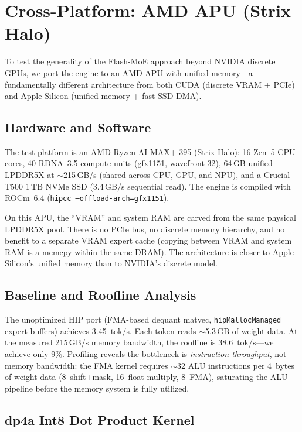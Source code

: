 \documentclass[10pt]{article}
\begin{document}
\section{Cross-Platform: AMD APU (Strix Halo)}
\label{sec:apu}

To test the generality of the Flash-MoE approach beyond NVIDIA discrete GPUs, we port the engine to an AMD APU with unified memory---a fundamentally different architecture from both CUDA (discrete VRAM + PCIe) and Apple Silicon (unified memory + fast SSD DMA).

\subsection{Hardware and Software}

The test platform is an AMD Ryzen AI MAX+ 395 (Strix Halo): 16 Zen~5 CPU cores, 40 RDNA~3.5 compute units (gfx1151, wavefront-32), 64\,GB unified LPDDR5X at $\sim$215\,GB/s (shared across CPU, GPU, and NPU), and a Crucial T500 1\,TB NVMe SSD (3.4\,GB/s sequential read). The engine is compiled with ROCm~6.4 (\texttt{hipcc --offload-arch=gfx1151}).

On this APU, the ``VRAM'' and system RAM are carved from the same physical LPDDR5X pool. There is no PCIe bus, no discrete memory hierarchy, and no benefit to a separate VRAM expert cache (copying between VRAM and system RAM is a memcpy within the same DRAM). The architecture is closer to Apple Silicon's unified memory than to NVIDIA's discrete model.

\subsection{Baseline and Roofline Analysis}

The unoptimized HIP port (FMA-based dequant matvec, \texttt{hipMallocManaged} expert buffers) achieves 3.45~tok/s. Each token reads $\sim$5.3\,GB of weight data. At the measured 215\,GB/s memory bandwidth, the roofline is 38.6~tok/s---we achieve only 9\%. Profiling reveals the bottleneck is \emph{instruction throughput}, not memory bandwidth: the FMA kernel requires $\sim$32 ALU instructions per 4~bytes of weight data (8~shift+mask, 16~float multiply, 8~FMA), saturating the ALU pipeline before the memory system is fully utilized.

\subsection{dp4a Int8 Dot Product Kernel}
\end{document}
